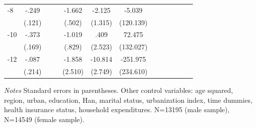 \begin{table}[h]
\begin{adjustbox}{max width=\linewidth}
\begin{threeparttable}
{\begin{tabular}{l*{6}{S
S}}
-8             &    -.249\sym{**} &         &         &   -1.662\sym{***}&   -2.125         &   -5.039         \\
                &   (.121)         &         &         &   (.502)         &  (1.315)         &(120.139)         \\
-10            &    -.373\sym{**} &         &         &   -1.019         &     .409         &   72.475         \\
                &   (.169)         &         &         &   (.829)         &  (2.523)         &(132.027)         \\
-12           &    -.087         &         &         &   -1.858         &  -10.814\sym{***}& -251.975         \\
                &   (.214)         &         &         &  (2.510)         &  (2.749)         &(234.610)         \\
\bottomrule
\end{tabular}
\begin{tablenotes}
\item \textit{Notes}   Standard errors in parentheses.
Other control variables: age squared, region, urban, education, Han, marital status, urbanization index, time dummies, health insurance status, household expenditures. N=13195 (male sample), N=14549 (female sample).
\end{tablenotes}
}
\end{threeparttable}
\end{adjustbox}
\end{table}


\clearpage
